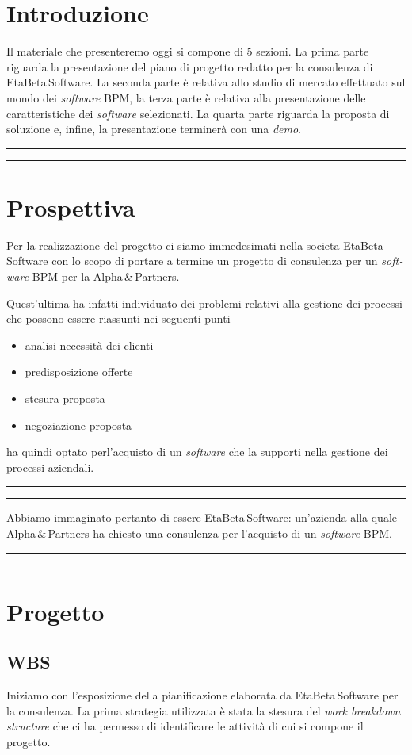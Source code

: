 \documentclass[a4paper,10pt]{article}
\newcommand{\inglese}[1]{\foreignlanguage{english}{\textit{#1}}}
\newcommand{\team}{\textsf{EtaBeta\,Software}\xspace}
\newcommand{\sw}{\inglese{software}\xspace}
\newcommand{\customer}{\textsf{Alpha\,\&\,Partners}\xspace}
\newcommand{\cambioslide}{%
\begin{center}
\Large
\rule[4pt]{0.2\linewidth}{.7pt} \ding{167} \rule[4pt]{0.2\linewidth}{.7pt}
\end{center}
}
\newcommand{\die}{%
\begin{center}
\fbox{$\mathcal{DIEGO}$}
\end{center}
}
\newcommand{\ele}{%
\begin{center}
\fbox{$\mathcal{ELENA}$}
\end{center}
}
\begin{document}
\die

\section{Introduzione}
Il materiale che presenteremo oggi si compone di 5 sezioni. La prima parte riguarda la presentazione del piano di progetto redatto per la consulenza di \team. La seconda parte è relativa allo studio di mercato effettuato sul mondo dei \sw BPM, la terza parte è relativa alla presentazione delle caratteristiche dei \sw selezionati. La quarta parte riguarda la proposta di soluzione e, infine, la presentazione terminerà con una \inglese{demo}.

\cambioslide

\section{Prospettiva}
Per la realizzazione del progetto ci siamo immedesimati nella societa \team con lo scopo di portare a termine un progetto di consulenza per un \sw BPM per la \customer.

Quest'ultima ha infatti individuato dei problemi relativi alla gestione dei processi che possono essere riassunti nei seguenti punti
\begin{itemize}
  \item analisi necessità dei clienti
  \item predisposizione offerte
  \item stesura proposta
  \item negoziazione proposta
\end{itemize}
ha quindi optato perl'acquisto di un \sw che la supporti nella gestione dei processi aziendali.

\cambioslide

Abbiamo immaginato pertanto di essere \team: un'azienda alla quale \customer ha chiesto una consulenza per l'acquisto di un \sw BPM.

\cambioslide

\ele

\section{Progetto}

\subsection{WBS}
Iniziamo con l'esposizione della pianificazione elaborata da \team per la consulenza. La prima strategia utilizzata è stata la stesura del \inglese{work breakdown structure} che ci ha permesso di identificare le attività di cui si compone il progetto.
\end{document}
